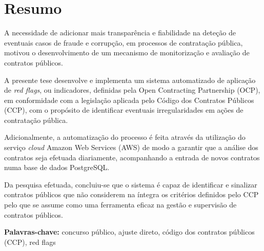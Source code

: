 
\chapter*{Resumo}
\label{Chp:Resumo}


A necessidade de adicionar mais transparência e fiabilidade na deteção de eventuais casos de fraude e corrupção, em processos de contratação pública, motivou o desenvolvimento de um mecanismo de monitorização e avaliação de contratos públicos. 

A presente tese desenvolve e implementa um sistema automatizado de aplicação de \textit{red flags}, ou indicadores, definidas pela Open Contracting Partnership (OCP), em conformidade com a legislação aplicada pelo Código dos Contratos Públicos (CCP), com o propósito de identificar eventuais irregularidades em ações de contratação pública.

Adicionalmente, a automatização do processo é feita através da utilização do serviço \textit{cloud} Amazon Web Services (AWS) de modo a garantir que a análise dos contratos seja efetuada diariamente, acompanhando a entrada de novos contratos numa base de dados PostgreSQL.

Da pesquisa efetuada, concluiu-se que o sistema é capaz de identificar e sinalizar contratos públicos que não considerem na íntegra os critérios definidos pelo CCP pelo que se assume como uma ferramenta eficaz na gestão e supervisão de contratos públicos.

\vspace{2cm}

\textbf{Palavras-chave:} concurso público, ajuste direto, código dos contratos públicos (CCP), red flags

